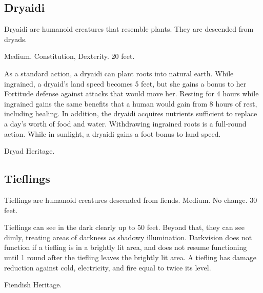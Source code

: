     \subsection{Dryaidi}

        Dryaidi are humanoid creatures that resemble plants. They are descended from dryads.

         Medium.
          Constitution,  Dexterity.
         20 feet.
        \begin{itemize}
             As a standard action, a dryaidi can plant roots into natural earth. While ingrained, a dryaid's land speed becomes 5 feet, but she gains a  bonus to her Fortitude defense against attacks that would move her. Resting for 4 hours while ingrained gains the same benefits that a human would gain from 8 hours of rest, including healing. In addition, the dryaidi acquires nutrients sufficient to replace a day's worth of food and water. Withdrawing ingrained roots is a full-round action.
             While in sunlight, a dryaidi gains a  foot bonus to land speed.
        \end{itemize}
         Dryad Heritage.

    \subsection{Tieflings}

        Tieflings are humanoid creatures descended from fiends.
         Medium.
         No change.
         30 feet.
        \begin{itemize}
             Tieflings can see in the dark clearly up to 50 feet. Beyond that, they can see dimly, treating areas of darkness as shadowy illumination. Darkvision does not function if a tiefling is in a brightly lit area, and does not resume functioning until 1 round after the tiefling leaves the brightly lit area.
             A tiefling has damage reduction against cold, electricity, and fire equal to twice its level.
        \end{itemize}
         Fiendish Heritage.


